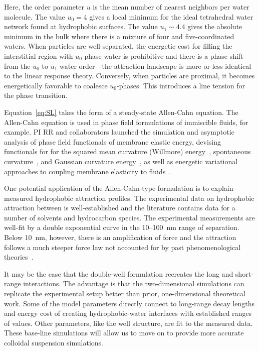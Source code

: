 Here, the order parameter $u$ is the mean number of nearest neighbors
per water molecule. The value $u_0 = 4$ gives a local minimum for the
ideal tetrahedral water network found at hydrophobic surfaces. The value
$u_1 \sim 4.4$ gives the absolute minimum in the bulk where there is a
mixture of four and five-coordinated waters. When particles are
well-separated, the energetic cost for filling the interstitial region
with $u_0$-phase water is prohibitive and there is a phase shift from
the $u_0$ to $u_1$ water order---the attraction landscape is more or
less identical to the linear response theory. Conversely, when particles
are proximal, it becomes energetically favorable to coalesce
$u_0$-phases. This introduces a line tension for the phase transition.

Equation~\eqref{eq:SL} takes the form of a steady-state Allen-Cahn
equation. The Allen-Cahn equation is used in phase field formulations of
immiscible fluids, for example. PI RR and collaborators launched the
simulation and asymptotic analysis of phase field functionals of
membrane elastic energy, devising functionals for for the squared mean
curvature (Willmore) energy~\cite{0951-7715-18-3-016}, spontaneous
curvature~\cite{Du05}, and Gaussian curvature energy~\cite{DuEuler}, as
well as energetic variational approaches to coupling membrane elasticity
to fluids~\cite{QiangDu09}. 

One potential application of the Allen-Cahn-type formulation is to
explain measured hydrophobic attraction profiles. The experimental data
on hydrophobic attraction between  is
well-established and the literature contains data for a number of
solvents and hydrocarbon species. The experimental measurements are
well-fit by a double exponential curve in the 10--100~nm range of
separation. Below 10~nm, however, there is an amplification of force and
the attraction follows a much steeper force law not accounted for by
past phenomenological theories~\cite{Lin2005}.

It may be the case that the double-well formulation recreates the long
and short-range interactions. The advantage is that the two-dimensional
simulations can replicate the experimental setup better than prior,
one-dimensional theoretical work. Some of the model parameters directly
connect to long-range decay lengths and energy cost of creating
hydrophobic-water interfaces with established ranges of values. Other
parameters, like the well structure, are fit to the measured data. These
base-line simulations will allow us to move on to provide more accurate
colloidal suspension simulations. 

